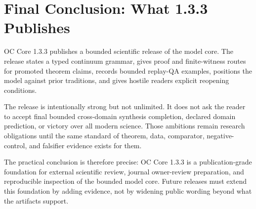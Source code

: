 \section{Final Conclusion: What 1.3.3 Publishes}

\label{sec:oc133-final-conclusion}

OC Core 1.3.3 publishes a bounded scientific release of the model core. The release states a typed continuum grammar, gives proof and finite-witness routes for promoted theorem claims, records bounded replay-QA examples, positions the model against prior traditions, and gives hostile readers explicit reopening conditions.


The release is intentionally strong but not unlimited. It does not ask the reader to accept final bounded cross-domain synthesis completion, declared domain prediction, or victory over all modern science. Those ambitions remain research obligations until the same standard of theorem, data, comparator, negative-control, and falsifier evidence exists for them.


The practical conclusion is therefore precise: OC Core 1.3.3 is a publication-grade foundation for external scientific review, journal owner-review preparation, and reproducible inspection of the bounded model core. Future releases must extend this foundation by adding evidence, not by widening public wording beyond what the artifacts support.

